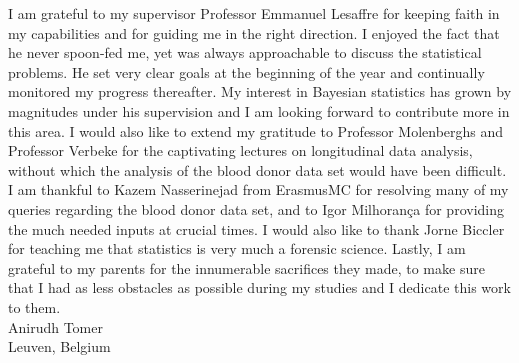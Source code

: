 I am grateful to my supervisor Professor Emmanuel Lesaffre for keeping faith in my capabilities and for guiding me in the right direction. I enjoyed the fact that he never spoon-fed me, yet was always approachable to discuss the statistical problems. He set very clear goals at the beginning of the year and continually monitored my progress thereafter. My interest in Bayesian statistics has grown by magnitudes under his supervision and I am looking forward to contribute more in this area. I would also like to extend my gratitude to Professor Molenberghs and Professor Verbeke for the captivating lectures on longitudinal data analysis, without which the analysis of the blood donor data set would have been difficult. I am thankful to Kazem Nasserinejad from ErasmusMC for resolving many of my queries regarding the blood donor data set, and to Igor Milhorança for providing the much needed inputs at crucial times. I would also like to thank Jorne Biccler for teaching me that statistics is very much a forensic science. Lastly, I am grateful to my parents for the innumerable sacrifices they made, to make sure that I had as less obstacles as possible during my studies and I dedicate this work to them.\\

Anirudh Tomer\\
Leuven, Belgium